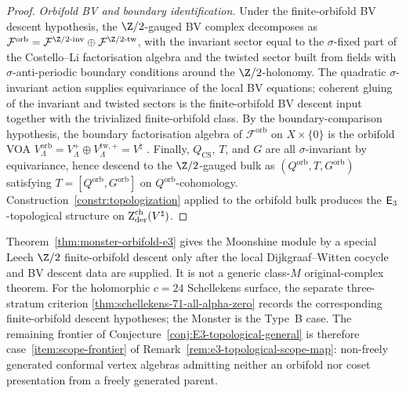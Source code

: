 \begin{proof}
\emph{Orbifold BV and boundary identification.}
Under the finite-orbifold BV descent hypothesis, the $\Z/2$-gauged BV
complex decomposes as
$\mathcal F^{\mathrm{orb}} =
\mathcal F^{\Z/2\text{-inv}} \oplus
\mathcal F^{\Z/2\text{-tw}}$, with the invariant sector
equal to the $\sigma$-fixed part of the Costello--Li
factorisation algebra and the twisted sector built from
fields with $\sigma$-anti-periodic boundary conditions
around the $\Z/2$-holonomy. The quadratic $\sigma$-invariant action
supplies equivariance of the local BV equations; coherent gluing of
the invariant and twisted sectors is the finite-orbifold BV descent
input together with the trivialized finite-orbifold class. By the
boundary-comparison hypothesis, the boundary factorisation algebra of
$\mathcal F^{\mathrm{orb}}$ on $X \times \{0\}$ is the orbifold VOA
$V_\Lambda^{\mathrm{orb}} = V_\Lambda^+ \oplus
V_\Lambda^{\mathrm{tw},+} = V^\natural$
\cite{Huang2015, DijkgraafVafaVerlindeVerlinde1989}.
Finally, $Q_{\mathrm{CS}}$, $T$, and $G$ are all
$\sigma$-invariant by equivariance, hence descend to the
$\Z/2$-gauged bulk as $(Q^{\mathrm{orb}}, T, G^{\mathrm{orb}})$
satisfying $T = [Q^{\mathrm{orb}}, G^{\mathrm{orb}}]$ on
$Q^{\mathrm{orb}}$-cohomology. Construction~\ref{constr:topologization}
applied to the orbifold bulk produces the
$\mathsf{E}_3$-topological structure on
$\operatorname{Z}_{\mathrm{der}}^{\mathrm{ch}}(V^\natural)$.
\end{proof}

\begin{remark}
\label{rem:monster-orbifold-route}
Theorem~\ref{thm:monster-orbifold-e3} gives the Moonshine module by a
special Leech $\Z/2$ finite-orbifold descent only after the local
Dijkgraaf--Witten cocycle and BV descent data are supplied. It is not a
generic class-$M$ original-complex theorem. For the holomorphic $c=24$
Schellekens surface, the separate three-stratum criterion
\ref{thm:schellekens-71-all-alpha-zero} records the corresponding
finite-orbifold descent hypotheses; the Monster is the Type~B case. The
remaining frontier of
Conjecture~\ref{conj:E3-topological-general} is therefore
case~\ref{item:scope-frontier} of
Remark~\ref{rem:e3-topological-scope-map}: non-freely
generated conformal vertex algebras admitting neither an
orbifold nor coset presentation from a freely generated
parent.
\end{remark}

